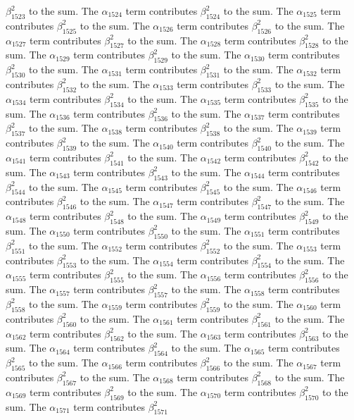 \begin{lemma}
$\beta_{1523}^{2}$ to the sum. The $\alpha_{1524}$ term contributes $\beta_{1524}^{2}$ to the sum. The $\alpha_{1525}$ term contributes $\beta_{1525}^{2}$ to the sum. The $\alpha_{1526}$ term contributes $\beta_{1526}^{2}$ to the sum. The $\alpha_{1527}$ term contributes $\beta_{1527}^{2}$ to the sum. The $\alpha_{1528}$ term contributes $\beta_{1528}^{2}$ to the sum. The $\alpha_{1529}$ term contributes $\beta_{1529}^{2}$ to the sum. The $\alpha_{1530}$ term contributes $\beta_{1530}^{2}$ to the sum. The $\alpha_{1531}$ term contributes $\beta_{1531}^{2}$ to the sum. The $\alpha_{1532}$ term contributes $\beta_{1532}^{2}$ to the sum. The $\alpha_{1533}$ term contributes $\beta_{1533}^{2}$ to the sum. The $\alpha_{1534}$ term contributes $\beta_{1534}^{2}$ to the sum. The $\alpha_{1535}$ term contributes $\beta_{1535}^{2}$ to the sum. The $\alpha_{1536}$ term contributes $\beta_{1536}^{2}$ to the sum. The $\alpha_{1537}$ term contributes $\beta_{1537}^{2}$ to the sum. The $\alpha_{1538}$ term contributes $\beta_{1538}^{2}$ to the sum. The $\alpha_{1539}$ term contributes $\beta_{1539}^{2}$ to the sum. The $\alpha_{1540}$ term contributes $\beta_{1540}^{2}$ to the sum. The $\alpha_{1541}$ term contributes $\beta_{1541}^{2}$ to the sum. The $\alpha_{1542}$ term contributes $\beta_{1542}^{2}$ to the sum. The $\alpha_{1543}$ term contributes $\beta_{1543}^{2}$ to the sum. The $\alpha_{1544}$ term contributes $\beta_{1544}^{2}$ to the sum. The $\alpha_{1545}$ term contributes $\beta_{1545}^{2}$ to the sum. The $\alpha_{1546}$ term contributes $\beta_{1546}^{2}$ to the sum. The $\alpha_{1547}$ term contributes $\beta_{1547}^{2}$ to the sum. The $\alpha_{1548}$ term contributes $\beta_{1548}^{2}$ to the sum. The $\alpha_{1549}$ term contributes $\beta_{1549}^{2}$ to the sum. The $\alpha_{1550}$ term contributes $\beta_{1550}^{2}$ to the sum. The $\alpha_{1551}$ term contributes $\beta_{1551}^{2}$ to the sum. The $\alpha_{1552}$ term contributes $\beta_{1552}^{2}$ to the sum. The $\alpha_{1553}$ term contributes $\beta_{1553}^{2}$ to the sum. The $\alpha_{1554}$ term contributes $\beta_{1554}^{2}$ to the sum. The $\alpha_{1555}$ term contributes $\beta_{1555}^{2}$ to the sum. The $\alpha_{1556}$ term contributes $\beta_{1556}^{2}$ to the sum. The $\alpha_{1557}$ term contributes $\beta_{1557}^{2}$ to the sum. The $\alpha_{1558}$ term contributes $\beta_{1558}^{2}$ to the sum. The $\alpha_{1559}$ term contributes $\beta_{1559}^{2}$ to the sum. The $\alpha_{1560}$ term contributes $\beta_{1560}^{2}$ to the sum. The $\alpha_{1561}$ term contributes $\beta_{1561}^{2}$ to the sum. The $\alpha_{1562}$ term contributes $\beta_{1562}^{2}$ to the sum. The $\alpha_{1563}$ term contributes $\beta_{1563}^{2}$ to the sum. The $\alpha_{1564}$ term contributes $\beta_{1564}^{2}$ to the sum. The $\alpha_{1565}$ term contributes $\beta_{1565}^{2}$ to the sum. The $\alpha_{1566}$ term contributes $\beta_{1566}^{2}$ to the sum. The $\alpha_{1567}$ term contributes $\beta_{1567}^{2}$ to the sum. The $\alpha_{1568}$ term contributes $\beta_{1568}^{2}$ to the sum. The $\alpha_{1569}$ term contributes $\beta_{1569}^{2}$ to the sum. The $\alpha_{1570}$ term contributes $\beta_{1570}^{2}$ to the sum. The $\alpha_{1571}$ term contributes $\beta_{1571}^{2}$ 
\end{lemma}
